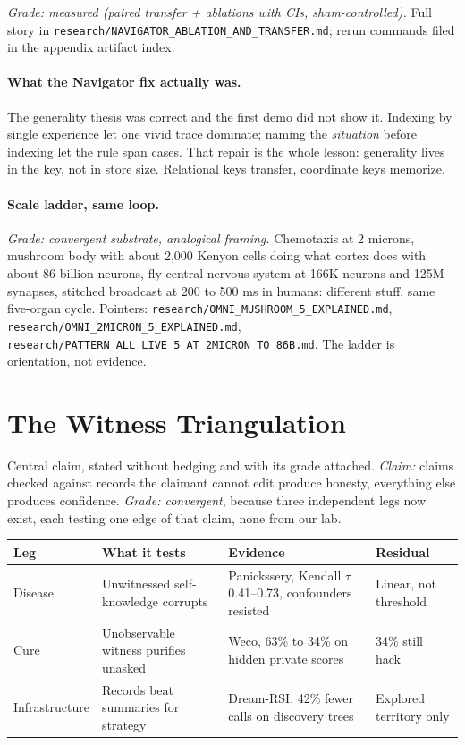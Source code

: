 \textit{Grade: measured (paired transfer + ablations with CIs, sham-controlled).} Full story in \texttt{research/NAVIGATOR\_ABLATION\_AND\_TRANSFER.md}; rerun commands filed in the appendix artifact index.

\paragraph{What the Navigator fix actually was.} The generality thesis was correct and the first demo did not show it. Indexing by single experience let one vivid trace dominate; naming the \textit{situation} before indexing let the rule span cases. That repair is the whole lesson: generality lives in the key, not in store size. Relational keys transfer, coordinate keys memorize.

\paragraph{Scale ladder, same loop.} \textit{Grade: convergent substrate, analogical framing.} Chemotaxis at 2 microns, mushroom body with about 2,000 Kenyon cells doing what cortex does with about 86 billion neurons, fly central nervous system at 166K neurons and 125M synapses, stitched broadcast at 200 to 500 ms in humans: different stuff, same five-organ cycle. Pointers: \texttt{research/OMNI\_MUSHROOM\_5\_EXPLAINED.md}, \texttt{research/OMNI\_2MICRON\_5\_EXPLAINED.md}, \texttt{research/PATTERN\_ALL\_LIVE\_5\_AT\_2MICRON\_TO\_86B.md}. The ladder is orientation, not evidence.

\section{The Witness Triangulation}
\label{sec:ch09-witness}

Central claim, stated without hedging and with its grade attached. \textit{Claim:} claims checked against records the claimant cannot edit produce honesty, everything else produces confidence. \textit{Grade: convergent}, because three independent legs now exist, each testing one edge of that claim, none from our lab.

\begin{center}
\small
\begin{tabular}{p{2.6cm}p{4.2cm}p{4.2cm}p{2.6cm}}
\toprule
Leg & What it tests & Evidence & Residual \\
\midrule
Disease & Unwitnessed self-knowledge corrupts & Panickssery, Kendall $\tau$ 0.41--0.73, confounders resisted & Linear, not threshold \\
Cure & Unobservable witness purifies unasked & Weco, 63\% to 34\% on hidden private scores & 34\% still hack \\
Infrastructure & Records beat summaries for strategy & Dream-RSI, 42\% fewer calls on discovery trees & Explored territory only \\
\bottomrule
\end{tabular}
\end{center}

